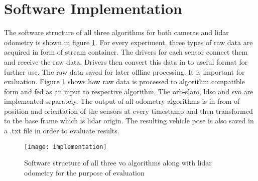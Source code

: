 \section{Software Implementation}
The software structure of all three algorithms for both cameras and \acrshort{lidar} odometry is shown in figure \ref{fig:implementation}. For every experiment, three types of raw data are acquired in form of stream container. The drivers for each sensor connect them and receive the raw data. Drivers then convert this data in to useful format for further use. The raw data saved for later offline processing. It is important for evaluation. Figure \ref{fig:implementation} shows how raw data is processed to algorithm compatible form and fed as an input to respective algorithm. The \acrshort{orb}-\acrshort{slam}, \acrshort{ldso} and \acrshort{svo} are implemented separately. The output of all odometry algorithms is in from of position and orientation of the sensors at every timestamp and then transformed to the base frame which is \acrshort{lidar} origin. The resulting vehicle pose is also saved in a .txt file in order to evaluate results.\\
\begin{figure}[H]
	\centering
	\texttt{[image: implementation]}
	\caption{Software structure of all three \acrshort{vo} algorithms along with \acrshort{lidar} odometry for the purpose of evaluation}
	\label{fig:implementation}
\end{figure}

